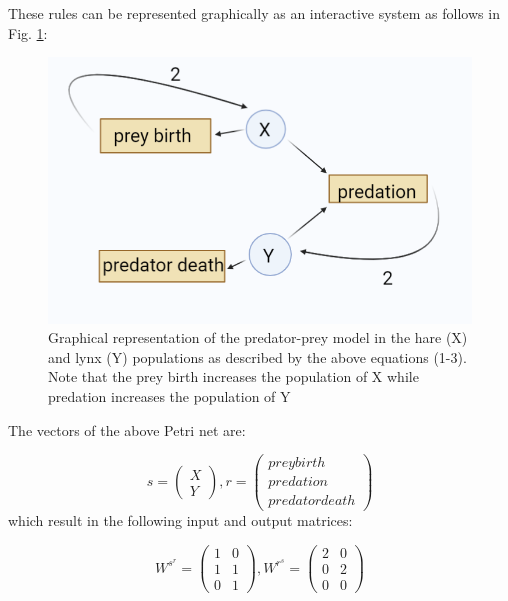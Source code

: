 \documentclass{article}
\begin{document}
These rules can be represented graphically as an interactive system as follows in Fig. \ref{fig:systemGraph}: 

\begin{figure}[H]
  \includegraphics[scale = 0.6]{system_graph.PNG}
  \caption{Graphical representation of the predator-prey model in the hare (X) and lynx (Y) populations as described by the above equations (1-3). Note that the prey birth increases the population of X while predation increases the population of Y }
  \label{fig:systemGraph}
\end{figure}

The vectors of the above Petri net are: 

\begin{equation}
    s = \begin{pmatrix}X\\Y\end{pmatrix},   r = \begin{pmatrix}prey birth\\predation\\ predator death\end{pmatrix}
\end{equation}
 which result in the following input and output matrices: 
 
 \begin{equation}
    W^s^r = \begin{pmatrix}1 & 0\\1 & 1 \\ 0 & 1 \end{pmatrix},   W^r^s = \begin{pmatrix}2 & 0\\0 & 2\\ 0 & 0\end{pmatrix}
\end{equation}
\end{document}
